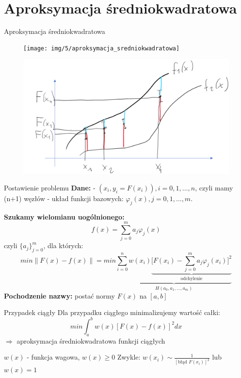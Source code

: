 \section{Aproksymacja średniokwadratowa}
\begin{frame}{Aproksymacja średniokwadratowa}
  	\begin{figure}
	\texttt{[image: img/5/aproksymacja\_sredniokwadratowa]}
	\end{figure}
\end{frame}
\begin{frame}
    \begin{figure}
        \includegraphics[height=0.7\textheight]{img/5/approx_przy.png}
    \end{figure}
\end{frame}
\begin{frame}{Postawienie problemu}
	\textbf{Dane:}\newline
    - ${(x_i,y_i = F(x_i)),i=0,1,\ldots,n}$, czyli mamy (n+1) węzłów \newline
    - układ funkcji bazowych: $\varphi_j(x), j=0,1,\ldots,m$.\newline\par
    \textbf{Szukamy wielomianu uogólnionego:}
    $$f(x) = \sum_{j = 0}^{m} a_j \varphi_j(x)$$
    czyli $\{{a_j}\}_{j=0}^m$, dla których:
    $$min \parallel F(x) - f(x) \parallel = min\underbrace{ \sum_{i=0}^{n}w(x_i)\underbrace{\bigg[F(x_i)-\sum_{j=0}^{m}a_j\varphi_j(x_i)\bigg]^2}_\text{odchylenie}}_{H(a_0,a_1,\ldots,a_m)}$$
    \textbf{Pochodzenie nazwy:} postać normy $F(x)$ na $[a,b]$
\end{frame}
\begin{frame}{Przypadek ciągły}
    Dla przypadku ciągłego minimalizujemy wartość całki:
    $$min\int_a^bw(x)[F(x)-f(x)]^2dx%
    $$
    $\Rightarrow$ aproksymacja średniokwadratowa funkcji ciągłych\newline

    $w(x)$ - funkcja wagowa, $w(x)\geqslant0$ \newline
    Zwykle: $w(x_i) \sim \frac{1}{[\text{błąd }F(x_i)]^2}$ lub $w(x) = 1$
\end{frame}
